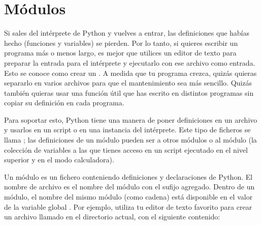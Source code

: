 \documentclass[a5paper,10pt,spanish]{sphinxmanual}
\begin{document}
\chapter{Módulos}
\label{\detokenize{tutorial/modules:modules}}\label{\detokenize{tutorial/modules:tut-modules}}\label{\detokenize{tutorial/modules::doc}}
\sphinxAtStartPar
Si sales del intérprete de Python y vuelves a entrar, las definiciones que habías hecho (funciones y variables) se pierden. Por lo tanto, si quieres escribir un programa más o menos largo, es mejor que utilices un editor de texto para preparar la entrada para el intérprete y ejecutarlo con ese archivo como entrada. Esto se conoce como crear un . A medida que tu programa crezca, quizás quieras separarlo en varios archivos para que el mantenimiento sea más sencillo. Quizás también quieras usar una función útil que has escrito en distintos programas sin copiar su definición en cada programa.

\sphinxAtStartPar
Para soportar esto, Python tiene una manera de poner definiciones en un archivo y usarlos en un script o en una instancia del intérprete. Este tipo de ficheros se llama ; las definiciones de un módulo pueden ser  a otros módulos o al módulo  (la colección de variables a las que tienes acceso en un script ejecutado en el nivel superior y en el modo calculadora).

\sphinxAtStartPar
Un módulo es un fichero conteniendo definiciones y declaraciones de Python. El nombre de archivo es el nombre del módulo con el sufijo  agregado. Dentro de un módulo, el nombre del mismo módulo (como cadena) está disponible en el valor de la variable global . Por ejemplo, utiliza tu editor de texto favorito para crear un archivo llamado  en el directorio actual, con el siguiente contenido:
\end{document}
